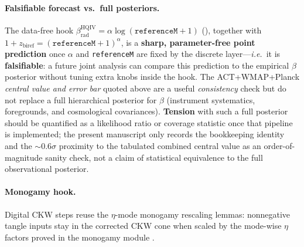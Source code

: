 \documentclass[11pt,a4paper]{article}
\newcommand{\lean}[1]{\path{#1}}
\theoremstyle{remark}
\begin{document}
\paragraph{Falsifiable forecast vs.\ full posteriors.}
The data-free hook $\beta_{\mathrm{rad}}^{\mathrm{HQIV}}=\alpha\log(\texttt{referenceM}+1)$ (\lean{betaRad_HQIV_imprint}), together with $1+z_{\mathrm{biref}}=(\texttt{referenceM}+1)^\alpha$, is a \textbf{sharp, parameter-free point prediction} once $\alpha$ and \texttt{referenceM} are fixed by the discrete layer---\emph{i.e.}\ it is \textbf{falsifiable}: a future joint analysis can compare this prediction to the empirical $\beta$ posterior without tuning extra knobs inside the hook. The ACT+WMAP+Planck \emph{central value and error bar} quoted above are a useful \emph{consistency} check but do not replace a full hierarchical posterior for $\beta$ (instrument systematics, foregrounds, and cosmological covariances). \textbf{Tension} with such a full posterior should be quantified as a likelihood ratio or coverage statistic once that pipeline is implemented; the present manuscript only records the bookkeeping identity and the $\sim 0.6\sigma$ proximity to the tabulated combined central value as an order-of-magnitude sanity check, not a claim of statistical equivalence to the full observational posterior.

\paragraph{Monogamy hook.}
Digital CKW steps reuse the $\eta$-mode monogamy rescaling lemmas: nonnegative tangle inputs stay in the corrected CKW cone when scaled by the mode-wise $\eta$ factors proved in the monogamy module \cite{ckw2000}.
\end{document}
